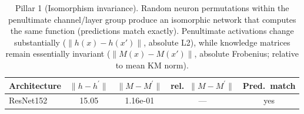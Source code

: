 \begin{table}[t]
\centering
\caption{Pillar 1 (Isomorphism invariance). Random neuron permutations within the penultimate channel/layer group produce an isomorphic network that computes the same function (predictions match exactly). Penultimate activations change substantially ($\|h(x)-h(x\prime)\|$, absolute L2), while knowledge matrices remain essentially invariant ($\|M(x)-M(x\prime)\|$, absolute Frobenius; relative to mean KM norm).}
\label{tab:iso_summary}
\begin{tabular}{lcccc}
\toprule
Architecture & $\|h - h^\prime\|$ & $\|M - M^\prime\|$ & rel.\ $\|M - M^\prime\|$ & Pred.\ match \\
\midrule
ResNet152 & 15.05 & 1.16e-01 & --- & yes \\
\bottomrule
\end{tabular}
\end{table}